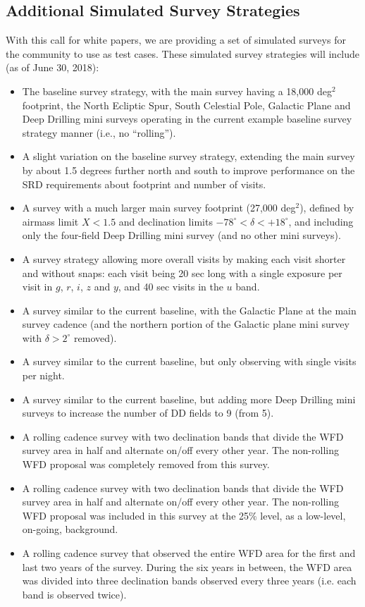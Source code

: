 \documentclass[DM,toc,usenatbib]{lsstdoc}
\begin{document}
\subsection{Additional Simulated Survey Strategies \label{sec:surveys}}

With this call for white papers, we are providing a set of
simulated surveys for the community to use as test cases. These simulated survey strategies will include (as of June 30, 2018): 
\begin{itemize}
\item The baseline survey strategy, with the main survey having a 18,000 deg$^2$ footprint, the North Ecliptic Spur, South Celestial Pole, Galactic Plane and Deep Drilling mini surveys operating in the current example baseline survey strategy manner (i.e., no ``rolling''). 
\item A slight variation on the baseline survey strategy, extending the main survey by about 1.5 degrees further north and south to improve performance on 
the SRD requirements about footprint and number of visits. 
\item A survey with a much larger main survey footprint (27,000 deg$^2$), defined by airmass limit $X<1.5$ and declination limits 
$-78^\circ< \delta < +18^\circ$, and including only the four-field Deep Drilling mini survey (and no other mini surveys).
\item A survey strategy allowing more overall visits by making each visit shorter and without snaps: each visit being 20 sec long with a single exposure per visit in $g$, $r$, $i$, $z$ and $y$, and 40 sec visits in the $u$ band.  
\item A survey similar to the current baseline, with the Galactic Plane at the main survey cadence (and the northern portion of the Galactic plane mini survey with $\delta>2^\circ$ removed).
\item A survey similar to the current baseline, but only observing with single visits per night.
\item A survey similar to the current baseline, but adding more Deep Drilling mini surveys to increase the number of DD fields to 9 (from 5). 
\item A rolling cadence survey with two declination bands that divide the WFD survey area in half and alternate on/off every other year. The non-rolling WFD proposal was completely removed from this survey.
\item A rolling cadence survey with two declination bands that divide the WFD survey area in half and alternate on/off every other year. The non-rolling WFD proposal was included in this survey at the 25$\%$ level, as a low-level, on-going, background. 
\item A rolling cadence survey that observed the entire WFD area for the first and last two years of the survey. During the six years in between, the WFD area was divided into three declination bands observed every three years (i.e. each band is observed twice).
\end{itemize}
\end{document}
